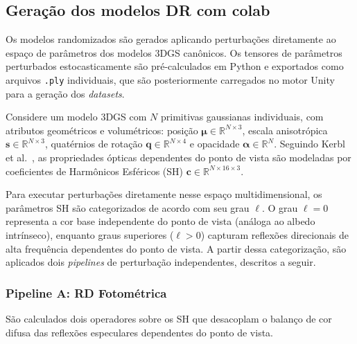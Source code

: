 \documentclass[a4paper,12pt]{article}
\begin{document}
{\subsection{Geração dos modelos DR com colab}

Os modelos randomizados são gerados aplicando perturbações diretamente ao espaço de parâmetros dos modelos 3DGS canônicos. Os tensores de parâmetros perturbados estocasticamente são pré-calculados em Python e exportados como arquivos \texttt{.ply} individuais, que são posteriormente carregados no motor Unity para a geração dos \emph{datasets}.

Considere um modelo 3DGS com $N$ primitivas gaussianas individuais, com atributos geométricos e volumétricos: posição $\boldsymbol{\mu} \in \mathbb{R}^{N\times 3}$, escala anisotrópica $\mathbf{s} \in \mathbb{R}^{N\times 3}$, quatérnios de rotação $\mathbf{q} \in \mathbb{R}^{N\times 4}$ e opacidade $\boldsymbol{\alpha} \in \mathbb{R}^{N}$. Seguindo Kerbl et al.~\cite{kerbl20233d}, as propriedades ópticas dependentes do ponto de vista são modeladas por coeficientes de Harmônicos Esféricos (SH) $\mathbf{c} \in \mathbb{R}^{N\times 16\times 3}$.

Para executar perturbações diretamente nesse espaço multidimensional, os parâmetros SH são categorizados de acordo com seu grau $\ell$. O grau $\ell = 0$ representa a cor base independente do ponto de vista (análoga ao albedo intrínseco), enquanto graus superiores ($\ell > 0$) capturam reflexões direcionais de alta frequência dependentes do ponto de vista. A partir dessa categorização, são aplicados dois \emph{pipelines} de perturbação independentes, descritos a seguir.

\subsubsection{Pipeline A: RD Fotométrica}

São calculados dois operadores sobre os SH que desacoplam o balanço de cor difusa das reflexões especulares dependentes do ponto de vista.

}
\end{document}
